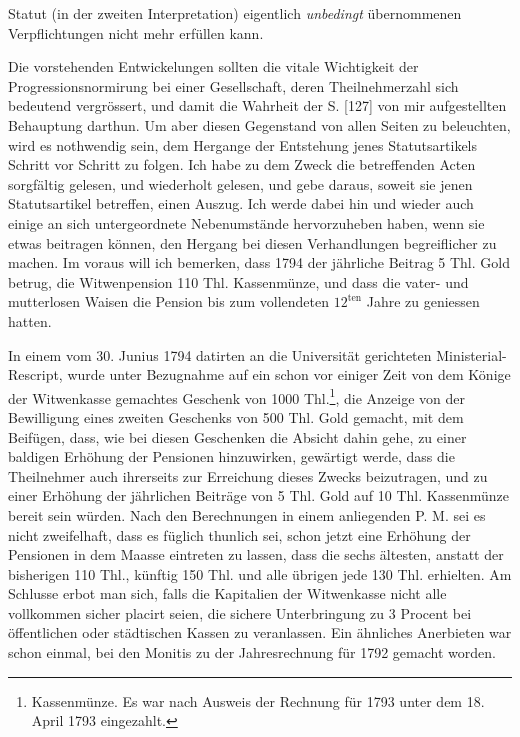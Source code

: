 Statut (in der zweiten Interpretation) eigentlich \textit{unbedingt} übernommenen Verpflichtungen nicht mehr erfüllen kann.

Die vorstehenden Entwickelungen sollten die vitale Wichtigkeit der Progressionsnormirung bei einer Gesellschaft, deren Theilnehmerzahl sich bedeutend vergrössert, und damit die Wahrheit der S. [127] von mir aufgestellten Behauptung darthun. Um aber diesen Gegenstand von allen Seiten zu beleuchten, wird es nothwendig sein, dem Hergange der Entstehung jenes Statutsartikels Schritt vor Schritt zu folgen. Ich habe zu dem Zweck die betreffenden Acten sorgfältig gelesen, und wiederholt gelesen, und gebe daraus, soweit sie jenen Statutsartikel betreffen, einen Auszug. Ich werde dabei hin und wieder auch einige an sich untergeordnete Nebenumstände hervorzuheben haben, wenn sie etwas beitragen können, den Hergang bei diesen Verhandlungen begreiflicher zu machen. Im voraus will ich bemerken, dass 1794 der jährliche Beitrag 5 Thl. Gold betrug, die Witwenpension 110 Thl. Kassenmünze, und dass die vater- und mutterlosen Waisen die Pension bis zum vollendeten \(12^{\text{ten}}\) Jahre zu geniessen hatten.

In einem vom 30. Junius 1794 datirten an die Universität gerichteten Ministerial-Rescript, wurde unter Bezugnahme auf ein schon vor einiger Zeit von dem Könige der Witwenkasse gemachtes Geschenk von 1000 Thl.\footnote{Kassenmünze. Es war nach Ausweis der Rechnung für 1793 unter dem 18. April 1793 eingezahlt.}, die Anzeige von der Bewilligung eines zweiten Geschenks von 500 Thl. Gold gemacht, mit dem Beifügen, dass, wie bei diesen Geschenken die Absicht dahin gehe, zu einer baldigen Erhöhung der Pensionen hinzuwirken, gewärtigt werde, dass die Theilnehmer auch ihrerseits zur Erreichung dieses Zwecks beizutragen, und zu einer Erhöhung der jährlichen Beiträge von 5 Thl. Gold auf 10 Thl. Kassenmünze bereit sein würden. Nach den Berechnungen in einem anliegenden P. M. sei es nicht zweifelhaft, dass es füglich thunlich sei, schon jetzt eine Erhöhung der Pensionen in dem Maasse eintreten zu lassen, dass die sechs ältesten, anstatt der bisherigen 110 Thl., künftig 150 Thl. und alle übrigen jede 130 Thl. erhielten. Am Schlusse erbot man sich, falls die Kapitalien der Witwenkasse nicht alle vollkommen sicher placirt seien, die sichere Unterbringung zu 3 Procent bei öffentlichen oder städtischen Kassen zu veranlassen. Ein ähnliches Anerbieten war schon einmal, bei den Monitis zu der Jahresrechnung für 1792 gemacht worden.

